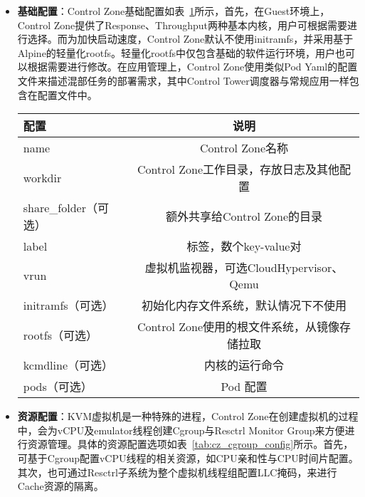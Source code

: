 \begin{itemize}
    \item \textbf{基础配置}：Control Zone基础配置如表~\ref{tab:cz_meta_config}所示，首先，在Guest环境上，Control Zone提供了Response、Throughput两种基本内核，用户可根据需要进行选择。而为加快启动速度，Control Zone默认不使用initramfs，并采用基于Alpine的轻量化rootfs。轻量化rootfs中仅包含基础的软件运行环境，用户也可以根据需要进行修改。在应用管理上，Control Zone使用类似Pod Yaml的配置文件来描述混部任务的部署需求，其中Control Tower调度器与常规应用一样包含在配置文件中。

\begin{table}[H]
    \label{tab:cz_meta_config}
    \footnotesize%
    \setlength{\tabcolsep}{4pt}%
    \renewcommand{\arraystretch}{1.25}%
    \centering
    \begin{tabular}{lc}
        \hline
        配置 & 说明\\
        \hline
        name & Control Zone名称 \\
        workdir & Control Zone工作目录，存放日志及其他配置 \\
        share\_folder（可选） & 额外共享给Control Zone的目录 \\
        label & 标签，数个key-value对 \\
        vrun & 虚拟机监视器，可选CloudHypervisor、Qemu \\
        initramfs（可选） & 初始化内存文件系统，默认情况下不使用 \\
        rootfs（可选） & Control Zone使用的根文件系统，从镜像存储拉取\\
        kcmdline（可选） & 内核的运行命令 \\
        pods（可选） & Pod 配置 \\
        \hline
    \end{tabular}
\end{table}

    \item \textbf{资源配置}：KVM虚拟机是一种特殊的进程，Control Zone在创建虚拟机的过程中，会为vCPU及emulator线程创建Cgroup与Resctrl Monitor Group来方便进行资源管理。具体的资源配置选项如表~\ref{tab:cz_cgroup_config}所示。首先，可基于Cgroup配置vCPU线程的相关资源，如CPU亲和性与CPU时间片配置。其次，也可通过Resctrl子系统为整个虚拟机线程组配置LLC掩码，来进行Cache资源的隔离。


\end{itemize}

